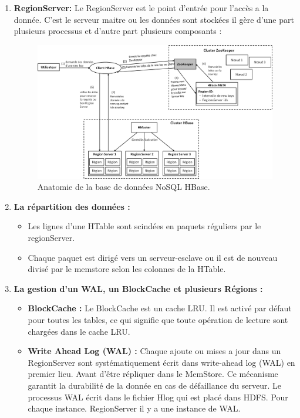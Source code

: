 \begin{enumerate}[label=\protect\ding{\value*}, start=182]

\item \textbf{RegionServer: } Le RegionServer est le point d'entrée pour l'accès a la donnée. C'est le serveur maitre ou les données sont stockées il gère d'une part plusieurs processus et d'autre part plusieurs composants :

\begin{figure}[h]
	\centering
    \includegraphics[scale=0.5]{img/part2/2.4}
    \caption{Anatomie de la base de données NoSQL HBase.}
\end{figure}

\item \textbf{La répartition des données :}
\begin{itemize}[label=\textbullet]
\item Les lignes d'une HTable sont scindées en paquets réguliers par le regionServer.
\item Chaque paquet est dirigé vers un serveur-esclave ou il est de nouveau divisé par le memstore selon les colonnes de la HTable.
\end{itemize}
		
\item \textbf{La gestion d'un WAL, un BlockCache et plusieurs Régions :}

\begin{itemize}[label=\textbullet]

\item  \textbf{BlockCache :} Le BlockCache est un cache LRU. Il est activé par défaut pour toutes les tables, ce qui signifie que toute opération de lecture sont chargées dans le cache LRU.

\item \textbf{Write Ahead Log (WAL) :} Chaque ajoute ou mises a jour dans un RegionServer sont systématiquement écrit dans write-ahead log (WAL) en premier lieu. Avant d'être répliquer dans le MemStore. Ce mécanisme garantit la durabilité de la donnée en cas de défaillance du serveur. Le processus WAL écrit dans le fichier Hlog qui est placé dans HDFS. Pour chaque instance. RegionServer il y a une instance de WAL.


\end{itemize}
\end{enumerate}
